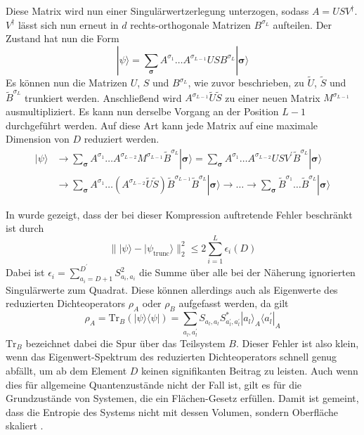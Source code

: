 \documentclass[10pt,a4paper]{report}
\begin{document}
Diese Matrix wird nun einer Singulärwertzerlegung unterzogen, sodass $A=USV^\dagger$. $V^\dagger$ lässt sich nun erneut in $d$ rechts-orthogonale Matrizen $B^{\sigma_L}$ aufteilen. Der Zustand hat nun die Form
\begin{equation}
|\psi\rangle=\sum_{\bm{\sigma}}A^{\sigma_1}\ldots A^{\sigma_{L-1}}USB^{\sigma_L}|\bm{\sigma}\rangle
\end{equation}
Es können nun die Matrizen $U$, $S$ und $B^{\sigma_L}$, wie zuvor beschrieben, zu $\tilde{U}$, $\tilde{S}$ und $\tilde{B}^{\sigma_L}$ trunkiert werden. Anschließend wird $A^{\sigma_{L-1}}\tilde{U}\tilde{S}$ zu einer neuen Matrix $M^{\sigma_{L-1}}$ ausmultipliziert. Es kann nun derselbe Vorgang an der Position $L-1$ durchgeführt werden. Auf diese Art kann jede  Matrix auf eine maximale Dimension von $D$ reduziert werden.
\begin{equation}\label{compression_equ}
\begin{split}
|\psi\rangle&\rightarrow \sum_{\bm{\sigma}}A^{\sigma_1}\ldots A^{\sigma_{L-2}}M^{\sigma_{L-1}}\tilde{B}^{\sigma_L}|\bm{\sigma}\rangle = \sum_{\bm{\sigma}}A^{\sigma_1}\ldots A^{\sigma_{L-2}}USV^{\prime}\tilde{B}^{\sigma_L}|\bm{\sigma}\rangle\\
&\rightarrow \sum_{\bm{\sigma}}A^{\sigma_1}\ldots (A^{\sigma_{L-2}}\tilde{U}\tilde{S})\tilde{B}^{\sigma_{L-1}}\tilde{B}^{\sigma_L}|\bm{\sigma}\rangle\rightarrow \ldots\rightarrow\sum_{\bm{\sigma}}\tilde{B}^{\sigma_1}\ldots \tilde{B}^{\sigma_{L}}|\bm{\sigma}\rangle
\end{split}
\end{equation}

In \cite{MPS_error} wurde gezeigt, dass der bei dieser Kompression auftretende Fehler beschränkt ist durch
\begin{equation}
\lVert|\psi\rangle-|\psi_{\text{trunc}}\rangle\rVert_2^2\leq 2\sum_{i=1}^{L}\epsilon_i(D)
\end{equation}
Dabei ist $\epsilon_i=\sum_{a_i=D+1}^{D^{\prime}}S_{a_i,a_i}^2$ die Summe über alle bei der Näherung ignorierten Singulärwerte zum Quadrat. Diese können allerdings auch als Eigenwerte des reduzierten Dichteoperators $\rho_A$ oder $\rho_B$ aufgefasst werden, da gilt
\begin{equation}
\rho_A=\text{Tr}_B(|\psi\rangle\langle\psi|)=\sum_{a_l,a_l^{\prime}}S_{a_l,a_l}S_{a_l^{\prime},a_l^{\prime}}^{\ast}|a_l\rangle_A\langle a_l^{\prime}|_A
\end{equation}
$\text{Tr}_B$ bezeichnet dabei die Spur über das Teilsystem $B$. Dieser Fehler ist also klein, wenn das Eigenwert-Spektrum des reduzierten Dichteoperators schnell genug abfällt, um ab dem Element $D$ keinen signifikanten Beitrag zu leisten. Auch wenn dies für allgemeine Quantenzustände nicht der Fall ist, gilt es für die Grundzustände von Systemen, die ein Flächen-Gesetz erfüllen. Damit ist gemeint, dass die Entropie des Systems nicht mit dessen Volumen, sondern Oberfläche skaliert \cite{Area_law}.\\
\end{document}
